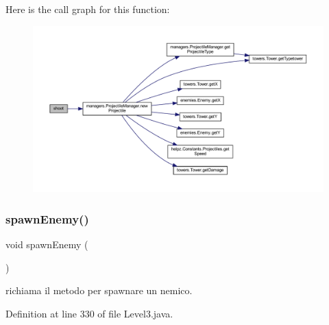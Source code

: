 Here is the call graph for this function\+:\nopagebreak
\begin{figure}[H]
\begin{center}
\leavevmode
\includegraphics[width=350pt]{classscenes_1_1_level3_a200b073564fc341f34b6112718742bae_cgraph}
\end{center}
\end{figure}
\mbox{\label{classscenes_1_1_level3_addfc0c3129b6ff606f7276e175f31a15}} 
\subsubsection{\texorpdfstring{spawn\+Enemy()}{spawnEnemy()}}
{\footnotesize\ttfamily void spawn\+Enemy (\begin{DoxyParamCaption}{ }\end{DoxyParamCaption})\hspace{0.3cm}{\ttfamily [private]}}



richiama il metodo per spawnare un nemico. 



Definition at line 330 of file Level3.\+java.

